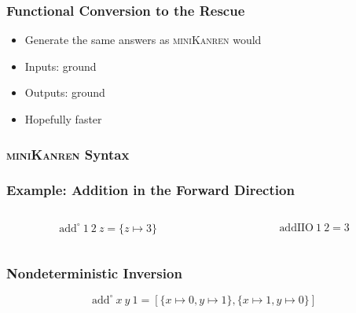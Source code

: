 \documentclass[xcolor=table, aspectratio=169]{beamer}
\newcommand{\mk}{\textsc{miniKanren}\xspace}
\begin{document}
\begin{frame}[fragile]
  \frametitle{Functional Conversion to the Rescue}
\begin{center}
  
\end{center}

\vfill

\begin{center}
  \begin{minipage}{0.4\textwidth}
    \begin{itemize}
      \item Generate the same answers as \mk would
      \item Inputs: ground 
      \item Outputs: ground 
      \item Hopefully faster
    \end{itemize}
  \end{minipage}
\end{center}
\end{frame}

\begin{frame}[fragile]
  \frametitle{\mk Syntax}
\begin{center}
  
\end{center}
\end{frame}

\begin{frame}[fragile]
  \frametitle{Example: Addition in the Forward Direction}
\begin{columns}
  \begin{column}[t]{0.49\textwidth}
    
    \[ \text{add}^{\circ}\ 1\ 2\ z = \{z \mapsto 3\}\]
  \end{column}
  \begin{column}[t]{0.49\textwidth}
    
    \[ \text{addIIO}\ 1\ 2 = 3 \] 
  \end{column}
\end{columns}
\end{frame}

\begin{frame}[fragile]
  \frametitle{Nondeterministic Inversion}


\vfill

\begin{center}
    \[ \text{add}^{\circ}\ x\ y\ 1 = \left[\{x \mapsto  0, y \mapsto 1\}, \{x \mapsto  1, y \mapsto  0\} \right] \] 
\end{center}
\end{frame}
\end{document}
